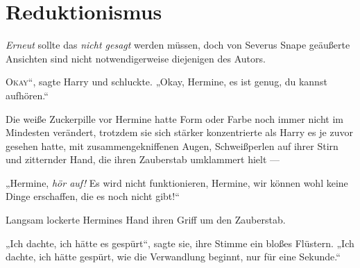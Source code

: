 \chapter{Reduktionismus}

\begin{chapterOpeningAuthorNote}
%
\emph{Erneut} sollte das \emph{nicht gesagt} werden müssen, doch von Severus Snape geäußerte Ansichten sind nicht notwendigerweise diejenigen des Autors.
\end{chapterOpeningAuthorNote}

\lettrine[ante=„]{O}{kay}“, sagte Harry und schluckte.
„Okay, Hermine, es ist genug, du kannst aufhören.“

Die weiße Zuckerpille vor Hermine hatte Form oder Farbe noch immer nicht im Mindesten verändert, trotzdem sie sich stärker konzentrierte als Harry es je zuvor gesehen hatte, mit zusammengekniffenen Augen, Schweißperlen auf ihrer Stirn und zitternder Hand, die ihren Zauberstab umklammert hielt —

„Hermine, \emph{hör auf!} Es wird nicht funktionieren, Hermine, wir können wohl keine Dinge erschaffen, die es noch nicht gibt!“

Langsam lockerte Hermines Hand ihren Griff um den Zauberstab.

„Ich dachte, ich hätte es gespürt“, sagte sie, ihre Stimme ein bloßes Flüstern.
„Ich dachte, ich hätte gespürt, wie die Verwandlung beginnt, nur für eine Sekunde.“

